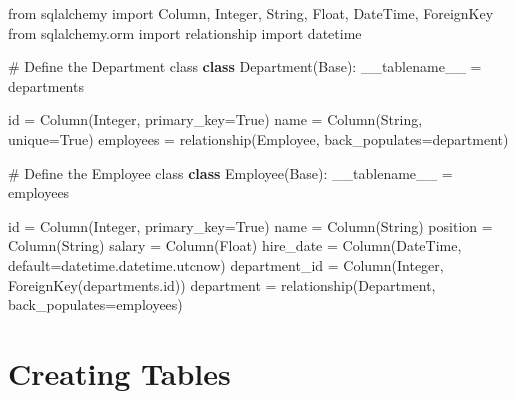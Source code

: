 \documentclass[
  letterpaper,
  DIV=11,
  numbers=noendperiod]{scrreprt}
\newenvironment{Shaded}{\begin{snugshade}}{\end{snugshade}}
\newcommand{\BuiltInTok}[1]{\textcolor[rgb]{0.00,0.23,0.31}{#1}}
\newcommand{\CommentTok}[1]{\textcolor[rgb]{0.37,0.37,0.37}{#1}}
\newcommand{\ImportTok}[1]{\textcolor[rgb]{0.00,0.46,0.62}{#1}}
\newcommand{\KeywordTok}[1]{\textcolor[rgb]{0.00,0.23,0.31}{\textbf{#1}}}
\newcommand{\NormalTok}[1]{\textcolor[rgb]{0.00,0.23,0.31}{#1}}
\newcommand{\OperatorTok}[1]{\textcolor[rgb]{0.37,0.37,0.37}{#1}}
\newcommand{\StringTok}[1]{\textcolor[rgb]{0.13,0.47,0.30}{#1}}
\newcommand{\VariableTok}[1]{\textcolor[rgb]{0.07,0.07,0.07}{#1}}
\begin{document}
\begin{Shaded}
\begin{Highlighting}[]
\ImportTok{from}\NormalTok{ sqlalchemy }\ImportTok{import}\NormalTok{ Column, Integer, String, Float, DateTime, ForeignKey}
\ImportTok{from}\NormalTok{ sqlalchemy.orm }\ImportTok{import}\NormalTok{ relationship}
\ImportTok{import}\NormalTok{ datetime}

\CommentTok{\# Define the Department class}
\KeywordTok{class}\NormalTok{ Department(Base):}
\NormalTok{    \_\_tablename\_\_ }\OperatorTok{=} \StringTok{\textquotesingle{}departments\textquotesingle{}}
    
    \BuiltInTok{id} \OperatorTok{=}\NormalTok{ Column(Integer, primary\_key}\OperatorTok{=}\VariableTok{True}\NormalTok{)}
\NormalTok{    name }\OperatorTok{=}\NormalTok{ Column(String, unique}\OperatorTok{=}\VariableTok{True}\NormalTok{)}
\NormalTok{    employees }\OperatorTok{=}\NormalTok{ relationship(}\StringTok{\textquotesingle{}Employee\textquotesingle{}}\NormalTok{, back\_populates}\OperatorTok{=}\StringTok{\textquotesingle{}department\textquotesingle{}}\NormalTok{)}

\CommentTok{\# Define the Employee class}
\KeywordTok{class}\NormalTok{ Employee(Base):}
\NormalTok{    \_\_tablename\_\_ }\OperatorTok{=} \StringTok{\textquotesingle{}employees\textquotesingle{}}
    
    \BuiltInTok{id} \OperatorTok{=}\NormalTok{ Column(Integer, primary\_key}\OperatorTok{=}\VariableTok{True}\NormalTok{)}
\NormalTok{    name }\OperatorTok{=}\NormalTok{ Column(String)}
\NormalTok{    position }\OperatorTok{=}\NormalTok{ Column(String)}
\NormalTok{    salary }\OperatorTok{=}\NormalTok{ Column(Float)}
\NormalTok{    hire\_date }\OperatorTok{=}\NormalTok{ Column(DateTime, default}\OperatorTok{=}\NormalTok{datetime.datetime.utcnow)}
\NormalTok{    department\_id }\OperatorTok{=}\NormalTok{ Column(Integer, ForeignKey(}\StringTok{\textquotesingle{}departments.id\textquotesingle{}}\NormalTok{))}
\NormalTok{    department }\OperatorTok{=}\NormalTok{ relationship(}\StringTok{\textquotesingle{}Department\textquotesingle{}}\NormalTok{, back\_populates}\OperatorTok{=}\StringTok{\textquotesingle{}employees\textquotesingle{}}\NormalTok{)}
\end{Highlighting}
\end{Shaded}

\section{Creating Tables}\label{creating-tables-1}
\end{document}
